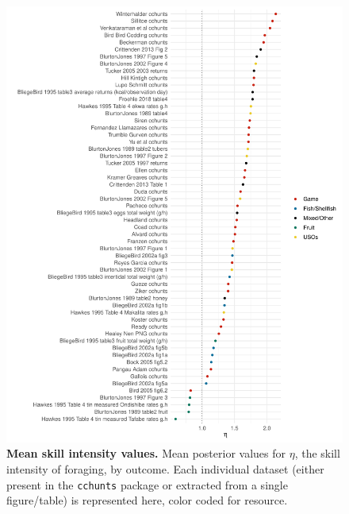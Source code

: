\begin{figure}[h]
    \centering
    \includegraphics[width=12cm] {text/images/Figure_S6.pdf}
    \renewcommand{\thefigure}{S\arabic{figure}}
    \caption{\textbf{Mean skill intensity values.} Mean posterior values for $\eta$, the skill intensity of foraging, by outcome. Each individual dataset (either present in the \texttt{cchunts} package or extracted from a single figure/table) is represented here, color coded for resource. }
    \label{fig:eta_outcome}
\end{figure}

